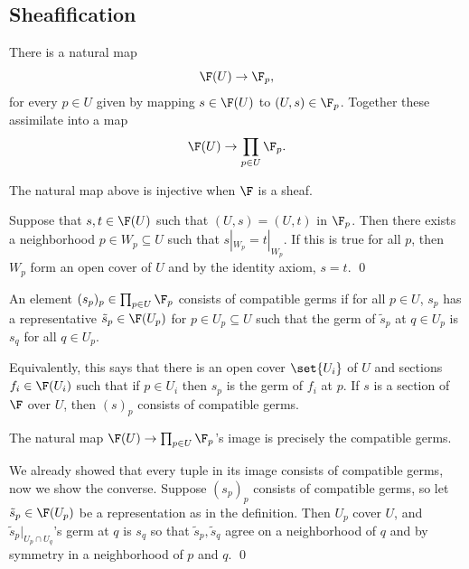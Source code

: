 \subsection{Sheafification}

There is a natural map
$$ \F(U) \to \F_p , $$
for every $p\in U$ given by mapping $s\in\F(U)$ to $(U,s)\in\F_p$.
Together these assimilate into a map
$$ \F(U) \to \prod_{p\in U}\F_p . $$

\bprop[name={inctostalk}]

    The natural map above is injective when $\F$ is a sheaf.

\eprop

\bproof

    Suppose that $s,t\in\F(U)$ such that $(U,s)=(U,t)$ in $\F_p$.
    Then there exists a neighborhood $p\in W_p\subseteq U$ such that $s|_{W_p}=t|_{W_p}$.
    If this is true for all $p$, then $W_p$ form an open cover of $U$ and by the identity axiom, $s=t$.
    \qed

\eproof

\bdefn

    An element $(s_p)_p\in\prod_{p\in U}\F_p$ consists of {\emphcolor compatible germs} if for all $p\in U$, $s_p$ has a representative
    $\tilde s_p\in\F(U_p)$ for $p\in U_p\subseteq U$ such that the germ of $\tilde s_p$ at $q\in U_p$ is $s_q$ for all $q\in U_p$.

\edefn

Equivalently, this says that there is an open cover $\set{U_i}$ of $U$ and sections $f_i\in\F(U_i)$ such that if $p\in U_i$ then $s_p$ is the germ
of $f_i$ at $p$.
If $s$ is a section of $\F$ over $U$, then $(s)_p$ consists of compatible germs.

\bprop[name={inctostalkim}]

    The natural map $\F(U)\to\prod_{p\in U}\F_p$'s image is precisely the compatible germs.

\eprop

\bproof

    We already showed that every tuple in its image consists of compatible germs, now we show the converse.
    Suppose $(s_p)_p$ consists of compatible germs, so let $\tilde s_p\in\F(U_p)$ be a representation as in the definition.
    Then $U_p$ cover $U$, and $\tilde s_p|_{U_p\cap U_q}$'s germ at $q$ is $s_q$ so that $\tilde s_p,\tilde s_q$ agree on a neighborhood of $q$
    and by symmetry in a neighborhood of $p$ and $q$.
    \qed

\eproof

